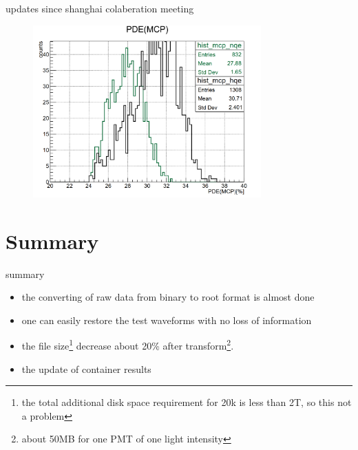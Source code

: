 \begin{frame}{updates since shanghai colaberation meeting}
\begin{figure}
\centering
\includegraphics[width=0.78\textwidth]{figures/zr03.png} %
\end{figure}
\end{frame}
\section{Summary}

\begin{frame}{summary}
\begin{itemize}
\item the converting of raw data from binary to root format is almost done  
\item one can easily restore the test waveforms with no loss of information
\item  the file size\footnote{the total additional disk space requirement for 20k is less than 2T, so this not a problem} decrease about 20\% after transform\footnote{about 50MB for one PMT of one light intensity}.
\item the update of container results
\end{itemize}
\end{frame}

